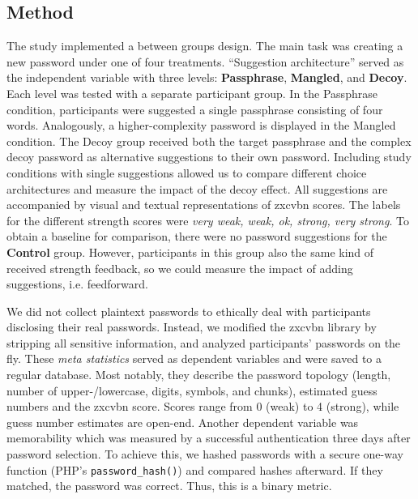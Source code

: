 \subsection{Method}
The study implemented a between groups design. The main task was creating a new password under one of four treatments. ``Suggestion architecture'' served as the independent variable with three levels: \textbf{Passphrase}, \textbf{Mangled}, and \textbf{Decoy}. Each level was tested with a separate participant group. In the Passphrase condition, participants were suggested a single passphrase consisting of four words. Analogously, a higher-complexity password is displayed in the Mangled condition. The Decoy group received both the target passphrase and the complex decoy password as alternative suggestions to their own password. Including study conditions with single suggestions allowed us to compare different choice architectures and measure the impact of the decoy effect. All suggestions are accompanied by visual and textual representations of zxcvbn scores. The labels for the different strength scores were \textit{very weak, weak, ok, strong, very strong}. To obtain a baseline for comparison, there were no password suggestions for the \textbf{Control} group. However, participants in this group also the same kind of received strength feedback, so we could measure the impact of adding suggestions, i.e. feedforward. 

We did not collect plaintext passwords to ethically deal with participants disclosing their real passwords. Instead, we modified the zxcvbn library by stripping all sensitive information, and analyzed participants' passwords on the fly. These \textit{meta statistics} served as dependent variables and were saved to a regular database. Most notably, they describe the password topology (length, number of upper-/lowercase, digits, symbols, and chunks), estimated guess numbers and the zxcvbn score. Scores range from 0 (weak) to 4 (strong), while guess number estimates are open-end. Another dependent variable was memorability which was measured by a successful authentication three days after password selection. To achieve this, we hashed passwords with a secure one-way function (PHP's \texttt{password\_hash()}) and compared hashes afterward. If they matched, the password was correct. Thus, this is a binary metric.

